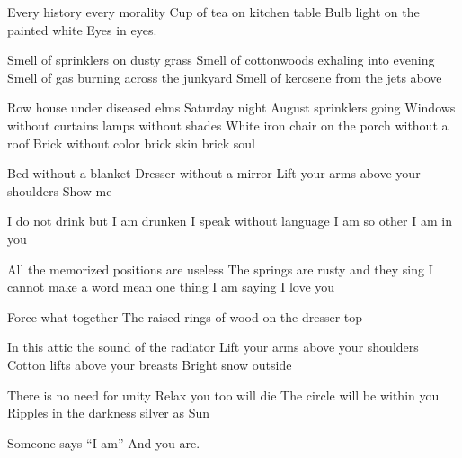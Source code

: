 \documentclass[english,11pt,letterpaper,onecolumn,parskip=full]{scrbook}
\begin{document}
\begin{poem}
\begin{stanza}
Every history every morality\verseline
Cup of tea on kitchen table\verseline
Bulb light on the painted white\verseline
Eyes in eyes.
\end{stanza}

\begin{stanza}
Smell of sprinklers on dusty grass\verseline
Smell of cottonwoods exhaling into evening\verseline
Smell of gas burning across the junkyard\verseline
Smell of kerosene from the jets above
\end{stanza}

\begin{stanza}
Row house under diseased elms\verseline
Saturday night August sprinklers going\verseline
Windows without curtains lamps without shades\verseline
White iron chair on the porch without a roof\verseline
Brick without color brick skin brick soul
\end{stanza}

\begin{stanza}
Bed without a blanket\verseline
Dresser without a mirror\verseline
Lift your arms above your shoulders\verseline
Show me
\end{stanza}

\begin{stanza}
I do not drink but I am drunken\verseline
I speak without language\verseline
I am so other\verseline
I am in you
\end{stanza}

\begin{stanza}
All the memorized positions are useless\verseline
The springs are rusty and they sing\verseline
I cannot make a word mean one thing\verseline
I am saying I love you
\end{stanza}

\begin{stanza}
Force what together\verseline
The raised rings of wood on the dresser top
\end{stanza}

\begin{stanza}
In this attic the sound of the radiator\verseline
Lift your arms above your shoulders\verseline
Cotton lifts above your breasts\verseline
Bright snow outside
\end{stanza}

\begin{stanza}
There is no need for unity\verseline
Relax you too will die\verseline
The circle will be within you\verseline
Ripples in the darkness silver as Sun
\end{stanza}

\begin{stanza}
Someone says ``I am''\verseline
And you are.%
\end{stanza}
\attribution{}
\end{poem}
\end{document}
